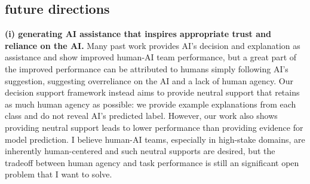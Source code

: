 

\subsection{future directions}

\textbf{(i) generating AI assistance that inspires appropriate trust and reliance on the AI.} 
Many past work provides AI's decision and explanation as assistance and show improved human-AI team performance, but a great part of the improved performance can be attributed to humans simply following AI's suggestion, suggesting overreliance on the AI and a lack of human agency.
Our decision support framework instead aims to provide neutral support that retains as much human agency as possible: we provide example explanations from each class and do not reveal AI's predicted label. 
However, our work also shows providing neutral support leads to lower performance than providing evidence for model prediction. 
I believe human-AI teams, especially in high-stake domains, are inherently human-centered and such neutral supports are desired, but the tradeoff between human agency and task performance is still an significant open problem that I want to solve. 



